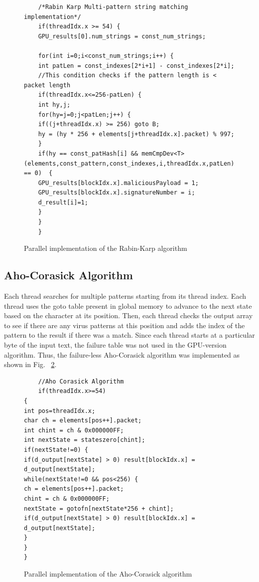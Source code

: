 \begin{figure}[H]
	\begin{lstlisting}
	/*Rabin Karp Multi-pattern string matching implementation*/
	if(threadIdx.x >= 54) {
	GPU_results[0].num_strings = const_num_strings;
	
	for(int i=0;i<const_num_strings;i++) {
	int patLen = const_indexes[2*i+1] - const_indexes[2*i];
	//This condition checks if the pattern length is < packet length
	if(threadIdx.x<=256-patLen) {
	int hy,j;
	for(hy=j=0;j<patLen;j++) {
	if((j+threadIdx.x) >= 256) goto B;
	hy = (hy * 256 + elements[j+threadIdx.x].packet) % 997;
	}
	if(hy == const_patHash[i] && memCmpDev<T>(elements,const_pattern,const_indexes,i,threadIdx.x,patLen) == 0)  {
	GPU_results[blockIdx.x].maliciousPayload = 1;
	GPU_results[blockIdx.x].signatureNumber = i; 
	d_result[i]=1;
	} 
	}
	}		
	\end{lstlisting}
	\caption{Parallel implementation of the Rabin-Karp algorithm}
	\label{fig:multi rabin-karp}
\end{figure}
\squeezeup

\subsection{Aho-Corasick Algorithm}
Each thread searches for multiple patterns starting from its thread index. Each thread uses the goto table present in global memory to advance to the next state based on the character at its position. Then, each thread checks the output array to see if there are any virus patterns at this position and adds the index of the pattern to the result if there was a match. Since each thread starts at a particular byte of the input text, the failure table was not used in the GPU-version algorithm. Thus, the failure-less Aho-Corasick algorithm was implemented \cite{bib20} as shown in Fig. ~\ref{fig:multi aho-cor}.

\begin{figure}[H]
	\begin{lstlisting}
	//Aho Corasick Algorithm
	if(threadIdx.x>=54)
{
int pos=threadIdx.x;
char ch = elements[pos++].packet;
int chint = ch & 0x000000FF; 
int nextState = stateszero[chint];
if(nextState!=0) {
if(d_output[nextState] > 0) result[blockIdx.x] = d_output[nextState];
while(nextState!=0 && pos<256) {
ch = elements[pos++].packet;
chint = ch & 0x000000FF;
nextState = gotofn[nextState*256 + chint];
if(d_output[nextState] > 0) result[blockIdx.x] = d_output[nextState];
}
}
}
	\end{lstlisting}
	\caption{Parallel implementation of the Aho-Corasick algorithm}
	\label{fig:multi aho-cor}
\end{figure}
\squeezeup

